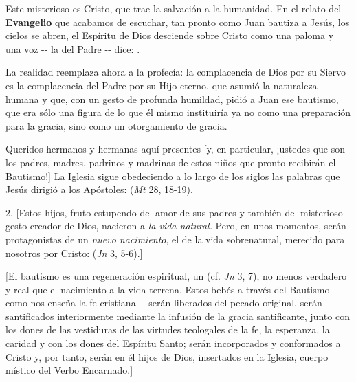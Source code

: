 \begin{body}
	Este misterioso  es Cristo, que trae la salvación a la humanidad. En el relato del \textbf{Evangelio} que acabamos de escuchar, tan pronto como Juan bautiza a Jesús, los cielos se abren, el Espíritu de Dios desciende sobre Cristo como una paloma y una voz -\/- la del Padre -\/- dice: .
	
	La realidad reemplaza ahora a la profecía: la complacencia de Dios por su Siervo es la complacencia del Padre por su Hijo eterno, que asumió la naturaleza humana y que, con un gesto de profunda humildad, pidió a Juan ese bautismo, que era sólo una figura de lo que él mismo instituiría ya no como una preparación para la gracia, sino como un otorgamiento de gracia.
	
	Queridos hermanos y hermanas aquí presentes {[}y, en particular, ¡ustedes que son los padres, madres, padrinos y madrinas de estos niños que pronto recibirán el Bautismo!{]} La Iglesia sigue obedeciendo a lo largo de los siglos las palabras que Jesús dirigió a los Apóstoles:  (\emph{Mt} 28, 18-19).
	
	2. {[}Estos hijos, fruto estupendo del amor de sus padres y también del misterioso gesto creador de Dios, nacieron a \emph{la vida natural.} Pero, en unos momentos, serán protagonistas de un \emph{nuevo nacimiento}, el de la vida sobrenatural, merecido para nosotros por Cristo:  (\emph{Jn} 3, 5-6).{]}
	
	{[}El bautismo es una regeneración espiritual, un  (cf. \emph{Jn} 3, 7), no menos verdadero y real que el nacimiento a la vida terrena. Estos bebés a través del Bautismo -\/- como nos enseña la fe cristiana -\/- serán liberados del pecado original, serán santificados interiormente mediante la infusión de la gracia santificante, junto con los dones de las vestiduras de las virtudes teologales de la fe, la esperanza, la caridad y con los dones del Espíritu Santo; serán incorporados y conformados a Cristo y, por tanto, serán en él hijos de Dios, insertados en la Iglesia, cuerpo místico del Verbo Encarnado.{]}
	

\end{body}
